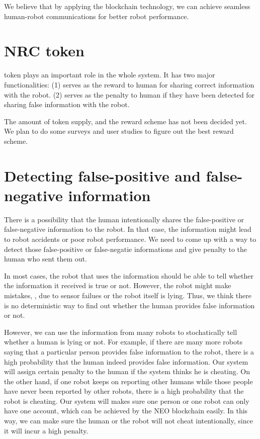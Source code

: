 \documentclass{article}
\begin{document}
We believe that by applying the \nrc blockchain technology, we
can achieve seamless human-robot communications for better
robot performance.


\section{NRC token}

\nrc token plays an important role in the whole system. 
It has two major functionalities: 
(1) serves as the reward to human for sharing correct information 
with the robot.
(2) serves as the penalty to human if they have been detected for
sharing false information with the robot.


The amount of token supply, and the reward scheme has not
been decided yet. We plan to do some surveys and user studies
to figure out the best reward scheme. 


\section{Detecting false-positive and false-negative information}
\label{sec:detect}


There is a possibility that the human intentionally shares the
false-positive or false-negative information to the robot. In
that case, the information might lead to robot accidents or 
poor robot performance.
We need to come up with a way to detect those false-positive or
false-negatie informations and give penalty to the human who
sent them out. 


In most cases, the robot that uses the information should be 
able to tell
whether the information it received is true or not. However,
the robot might make mistakes, \eg, due to sensor 
failues or the robot itself is lying.
Thus, we think there is no deterministic way to find out whether
the human provides false information or not.

However, we can use the information from many robots to
stochatically tell whether a human is lying or not. For example,
if there are many more robots saying that a particular person
provides false information to the robot, there is a high
probability that the human indeed provides false information.
Our \nrc system will assign certain penalty to the human if the
system thinks he is cheating. 
On the other hand, if one robot keeps on reporting other humans
while those people have never been reported by other robots, there
is a high probability that the robot is cheating.
Our system will
makes sure one person or one robot can only have one account, 
which can be 
achieved by the NEO blockchain easily. In this way, we can 
make sure the human or the robot will not cheat intentionally, 
since it will incur a high penalty.
\end{document}

